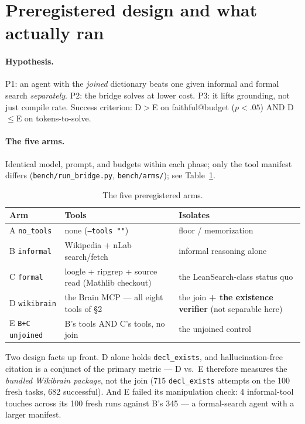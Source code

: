 \documentclass[10pt]{article}
\newcommand{\code}[1]{\texttt{#1}}
\begin{document}
\section{Preregistered design and what actually ran}\label{sec:design}

\paragraph{Hypothesis.} P1: an agent with the \emph{joined} dictionary
beats one given informal and formal search \emph{separately}. P2: the
bridge solves at lower cost. P3: it lifts grounding, not just compile
rate. Success criterion: D$>$E on faithful@budget ($p<.05$) AND D$\leq$E
on tokens-to-solve.

\paragraph{The five arms.} Identical model, prompt, and budgets within
each phase; only the tool manifest differs (\code{bench/run\_bridge.py},
\code{bench/arms/}); see Table~\ref{tab:arms}.

\begin{table}[htbp]
\centering
\footnotesize
\begin{tabular}{@{}lp{}p{}@{}}
\toprule
Arm & Tools & Isolates \\
\midrule
A \code{no\_tools} & none (\code{--tools ""}) & floor / memorization \\
B \code{informal} & Wikipedia + nLab search/fetch & informal reasoning alone \\
C \code{formal} & loogle + ripgrep + source read (Mathlib checkout) & the LeanSearch-class status quo \\
D \code{wikibrain} & the Brain MCP --- all eight tools of \S2 & the join \textbf{+ the existence verifier} (not separable here) \\
E \code{B+C unjoined} & B's tools AND C's tools, no join & the unjoined control \\
\bottomrule
\end{tabular}
\caption{The five preregistered arms.}
\label{tab:arms}
\end{table}

Two design facts up front. D alone holds \code{decl\_exists}, and
hallucination-free citation is a conjunct of the primary metric --- D
vs.\ E therefore measures the \emph{bundled Wikibrain package}, not the
join (715 \code{decl\_exists} attempts on the 100 fresh tasks, 682
successful). And E failed its manipulation check: 4 informal-tool touches
across its 100 fresh runs against B's 345 --- a formal-search agent with a
larger manifest.
\end{document}
